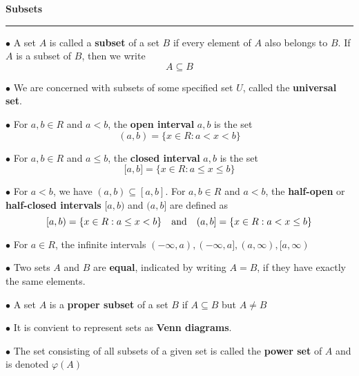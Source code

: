 {\bf Subsets}
\hrule
\vskip 6pt

$\bullet$ A set $A$ is called a {\bf subset} of a set $B$ if every element of $A$ also belongs to $B$. If $A$ is a subset of $B$, then we write $$A \subseteq B$$

$\bullet$ We are concerned with subsets of some specified set $U$, called the {\bf universal set}.
\vskip 1pc

$\bullet$ For $a,b \in R$ and $a<b$, the {\bf open interval} $a,b$ is the set $$(a,b)= {\lbrace x\in R: a<x<b \rbrace}$$
\vskip 1pc

$\bullet$ For $a,b \in R$ and $a\leq b$, the {\bf closed interval} $a,b$ is the set $$\lbrack a,b\rbrack= {\lbrace x\in R: a\leq x\leq b \rbrace}$$
\vskip 1pc

$\bullet$ For $a<b$, we have $(a,b)\subseteq [a,b]$. For $a,b \in R$ and $a<b$, the {\bf half-open} or {\bf half-closed intervals} $[a,b)$ and $(a,b]$ are defined as $$[a,b)= \lbrace x\in R: a\leq x < b\rbrace \quad\hbox{and}\quad (a,b]= \lbrace x\in R: a< x\leq b\rbrace $$
\vskip 1pc

$\bullet$ For $a\in R$, the infinite intervals $(-\infty,a),(-\infty,a],(a,\infty), [a,\infty)$
\vskip 1pc

$\bullet$ Two sets $A$ and $B$ are {\bf equal}, indicated by writing $A=B$, if they have exactly the same elements.
\vskip 1pc

$\bullet$ A set $A$ is a {\bf proper subset} of a set $B$ if $A \subseteq B$ but $A\neq B$
\vskip 1pc

$\bullet$ It is convient to represent sets as {\bf Venn diagrams}.
\vskip 1pc

$\bullet$ The set consisting of all subsets of a given set is called the {\bf power set} of $A$ and is denoted $\varphi(A)$

\vfill\eject

